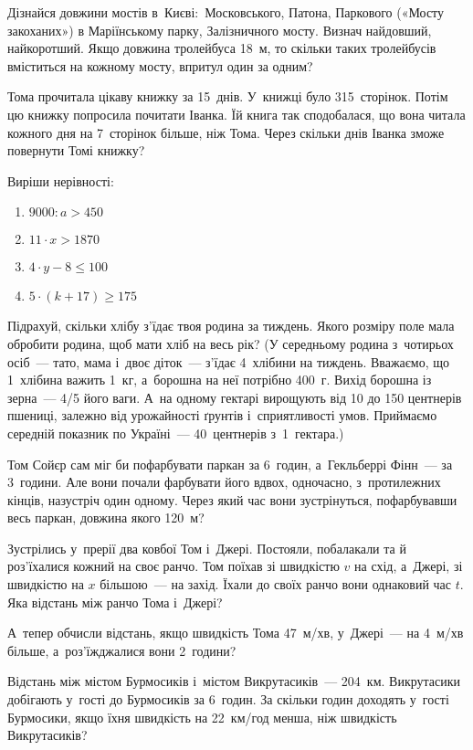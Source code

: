 \problem
Дізнайся довжини мостів в~Києві: Московського, Патона,
Паркового («Мосту закоханих») в Маріїнському парку, Залізничного мосту.
Визнач найдовший, найкоротший.
Якщо довжина тролейбуса 18~м, то скільки таких тролейбусів
вміститься на кожному мосту, впритул один за одним?


\problem
Тома прочитала цікаву книжку за 15~днів. У~книжці було 315~сторінок.
Потім цю книжку попросила почитати Іванка. Їй книга так сподобалася,
що вона читала кожного дня на 7~сторінок більше, ніж Тома.
Через скільки днів Іванка зможе повернути Томі книжку?


\problem
Виріши нерівності:
\begin{multicols}{2}
  \begin{enumerate}
    \item $9000 : a > 450$
    \item $11 \cdot x > 1870$
    \item $4 \cdot y - 8 \leqslant 100$
    \item $5 \cdot (k + 17) \geqslant 175$
  \end{enumerate}
\end{multicols}


\problem
Підрахуй, скільки хлібу з’їдає твоя родина за тиждень.
Якого розміру поле мала обробити родина, щоб мати хліб на весь рік?
(У середньому родина з~чотирьох осіб~--- тато, мама і~двоє діток~---
з’їдає 4~хлібини на тиждень. Вважаємо, що 1~хлібина важить 1~кг,
а~борошна на неї потрібно 400~г. Вихід борошна із зерна~--- 4/5 його ваги.
А~на одному гектарі вирощують від 10 до 150 центнерів пшениці,
залежно від урожайності ґрунтів і~сприятливості умов.
Приймаємо середній показник по Україні~---
40~центнерів з~1~гектара.)


\problem
Том Сойєр сам міг би пофарбувати паркан за 6~годин,
а~Гекльберрі Фінн~--- за 3~години. Але вони почали фарбувати його вдвох,
одночасно, з~протилежних кінців, назустріч один одному.
Через який час вони зустрінуться, пофарбувавши весь паркан,
довжина якого 120~м?


\problem
Зустрілись у~прерії два ковбої Том і~Джері. Постояли, побалакали та й
роз’їхалися кожний на своє ранчо. Том поїхав зі швидкістю $v$ на схід,
а~Джері, зі швидкістю на $x$ більшою~--- на захід. Їхали до своїх ранчо
вони однаковий час $t$. Яка відстань між ранчо Тома і~Джері?

А~тепер обчисли відстань, якщо швидкість Тома 47~м/хв,
у~Джері~--- на 4~м/хв більше, а~роз’їжджалися вони 2~години?


\problem
Відстань між містом Бурмосиків і~містом Викрутасиків~--- 204~км.
Викрутасики добігають у~гості до Бурмосиків за 6~годин.
За скільки годин доходять у~гості Бурмосики,
якщо їхня швидкість на 22~км/год менша, ніж швидкість Викрутасиків?


